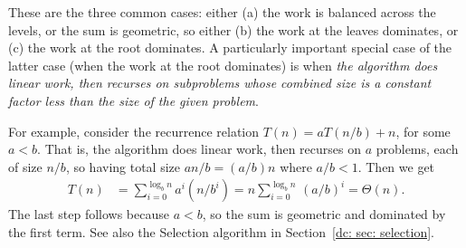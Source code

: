 \medskip

These are the three common cases:
either (a) the work is balanced across the levels,
or the sum is geometric, so either (b) the work at the leaves dominates,
or (c) the work at the root dominates.
A particularly important special case of the latter case
(when the work at the root dominates)
is when \emph{the algorithm does linear work,
then recurses on subproblems whose combined size
is a constant factor less than the size of the given problem}.

For example,
consider the recurrence relation $T(n) = a T(n/b) + n$,
for some $a < b$.  That is, the algorithm does linear work,
then recurses on $a$ problems, each of size $n/b$,
so having total size $an/b = (a/b) n$ where $a/b < 1$.
Then we get
\begin{align*}
  T(n) & {} = \sum_{i=0}^{\log_b n} a^i (n/b^i) = n \sum_{i=0}^{\log_b n}\, (a/b)^i
           = \Theta(n).
\end{align*}
The last step follows because $a < b$, so the sum is geometric
and dominated by the first term.
See also the Selection algorithm in Section~\ref{dc: sec: selection}.


